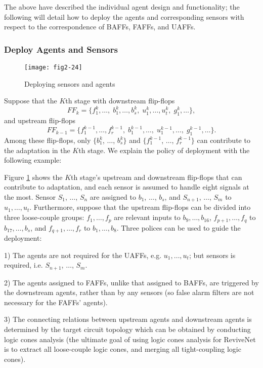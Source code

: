 The above have described the individual agent design and functionality; the following will detail how to deploy the agents and corresponding sensors with respect to the correspondence of BAFFs, FAFFs, and UAFFs.

\subsubsection{Deploy Agents and Sensors}\label{deploy_agentsensor}
\begin{figure}[t]
\centering
\texttt{[image: fig2-24]}%
   \caption{Deploying sensors and agents}\label{delpoy}
\end{figure}

Suppose that the $K$th stage with downstream flip-flops $$FF_{k}=\{f_1^{k}, \ldots,\; b_1^{k}, \ldots, b_s^{k}, \;u_1^{k}, \ldots, u_t^{k}, \;g_1^k, \ldots \}, $$ and upstream flip-flops $$FF_{k-1}=\{f_1^{k-1}, \ldots,  f_r^{k-1},\; b_1^{k-1}, \ldots, \;u_1^{k-1}, \ldots, \;g_1^{k-1}, \ldots \}.$$ Among these flip-flops, only $\{b_1^{k}$, $\ldots$, $b_s^{k}\}$ and $\{f_1^{k-1}$, $\ldots$, $f_r^{k-1}\}$ can contribute to the adaptation in the $K$th stage. We explain the policy of
deployment with the following example:

Figure \ref{delpoy} shows the $K$th stage's upstream and downstream flip-flops that can contribute to adaptation, and each sensor is assumed to handle eight signals at the most. Sensor $S_1$, $\ldots$, $S_n$ are assigned to $b_1$, $\ldots$, $b_s$, and $S_{n+1}$, $\ldots$, $S_m$ to $u_1,\ldots, u_t$. Furthermore, suppose that the upstream flip-flops can be divided into three loose-couple groups: $f_1,\ldots, f_p$ are relevant inputs to $b_9, \ldots, b_{16}$, $f_{p+1},\ldots, f_q$ to $b_{17}, \ldots, b_s$, and $f_{q+1},\ldots, f_r$ to $b_1, \ldots, b_8$. Three polices can be used to guide the deployment:

1) The agents are not required for the UAFFs, e.g. $u_1, \ldots, u_t$; but sensors is required,
i.e. $S_{n+1}$, $\ldots$, $S_m$.

2) The agents assigned to FAFFs, unlike that assigned to BAFFs, are triggered by the downstream agents, rather than by any sensors (so false alarm filters are not necessary for the FAFFs' agents).

3) The connecting relations between upstream agents and downstream agents is determined by the target circuit topology which can be obtained by conducting logic cones analysis (the ultimate goal of using logic cones analysis for ReviveNet is to extract all loose-couple logic cones, and merging all tight-coupling logic cones).

